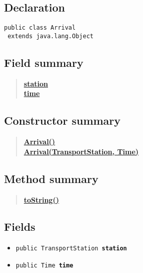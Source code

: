 \documentclass[11pt,a4paper]{report}
\begin{document}
{{{{{{{{{{{\subsection{Declaration}{
\begin{lstlisting}[frame=none]
public class Arrival
 extends java.lang.Object\end{lstlisting}
\subsection{Field summary}{
\begin{verse}
\hyperlink{Models.Arrival.station}{{\bf station}} \\
\hyperlink{Models.Arrival.time}{{\bf time}} \\
\end{verse}
}
\subsection{Constructor summary}{
\begin{verse}
\hyperlink{Models.Arrival()}{{\bf Arrival()}} \\
\hyperlink{Models.Arrival(Models.TransportStation, Models.Time)}{{\bf Arrival(TransportStation, Time)}} \\
\end{verse}
}
\subsection{Method summary}{
\begin{verse}
\hyperlink{Models.Arrival.toString()}{{\bf toString()}} \\
\end{verse}
}
\subsection{Fields}{
\begin{itemize}
\item{
\label{Models.Arrival.station}\hypertarget{Models.Arrival.station}{\texttt{public TransportStation\ {\bf  station}}
}
}
\item{
\label{Models.Arrival.time}\hypertarget{Models.Arrival.time}{\texttt{public Time\ {\bf  time}}
}
}
\end{itemize}
}
}}}}}}}}}}}}
\end{document}
